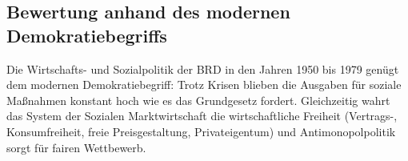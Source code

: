 \subsection*{Bewertung anhand des modernen Demokratiebegriffs}

Die Wirtschafts- und Sozialpolitik der BRD in den Jahren 1950 bis 1979
genügt dem modernen Demokratiebegriff: Trotz Krisen blieben die
Ausgaben für soziale Maßnahmen konstant hoch wie es das Grundgesetz
fordert. Gleichzeitig wahrt das System der Sozialen Marktwirtschaft die
wirtschaftliche Freiheit (Vertrags-, Konsumfreiheit, freie
Preisgestaltung, Privateigentum) und Antimonopolpolitik sorgt für
fairen Wettbewerb.

\endinput
